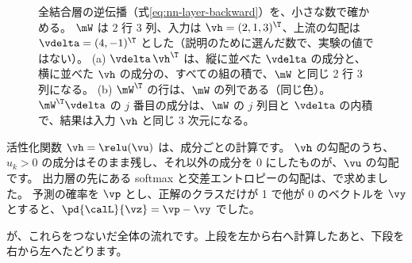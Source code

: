 \begin{figure}[tbp]
\caption{全結合層の逆伝播（式\eqref{eq:nn-layer-backward}）を、小さな数で確かめる。
$\mW$ は 2 行 3 列、入力は $\vh=(2,1,3)^\T$、上流の勾配は $\vdelta=(4,-1)^\T$ とした（説明のために選んだ数で、実験の値ではない）。
(a) $\vdelta\,\vh^\T$ は、縦に並べた $\vdelta$ の成分と、横に並べた $\vh$ の成分の、すべての組の積で、$\mW$ と同じ 2 行 3 列になる。
(b) $\mW^\T$ の行は、$\mW$ の列である（同じ色）。$\mW^\T\vdelta$ の $j$ 番目の成分は、$\mW$ の $j$ 列目と $\vdelta$ の内積で、結果は入力 $\vh$ と同じ 3 次元になる。}
\label{fig:nn-outer}
\end{figure}

活性化関数 $\vh=\relu(\vu)$ は、成分ごとの計算です。
$\vh$ の勾配のうち、$u_k>0$ の成分はそのまま残し、それ以外の成分を 0 にしたものが、$\vu$ の勾配です。
出力層の先にある softmax と交差エントロピーの勾配は、で求めました。
予測の確率を $\vp$ とし、正解のクラスだけが 1 で他が 0 のベクトルを $\vy$ とすると、$\pd{\calL}{\vz}=\vp-\vy$ でした。

が、これらをつないだ全体の流れです。上段を左から右へ計算したあと、下段を右から左へたどります。

